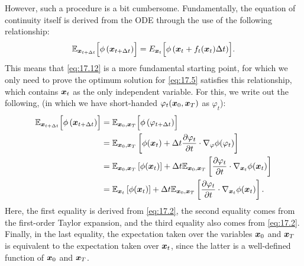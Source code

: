 However, such a procedure is a bit cumbersome. Fundamentally, the equation of continuity itself is derived from the ODE through the use of the following relationship:
\begin{equation}
    \label{eq:17.12}
\mathbb{E}_{\bm{x}_{t+\Delta t}}\Bigl[ \phi\left(\bm{x}_{t+\Delta t} \right)\Bigr]=E_{\bm{x}_{t}}\Bigl[\phi \left(\bm{x}_t +f_t(\bm{x}_t)\Delta t \right) \Bigr].
\end{equation}
This means that \cref{eq:17.12} is a more fundamental starting point, for which we only need to prove the optimum solution for \cref{eq:17.5} satisfies this relationship, which contains $\bm{x}_{t}$ as the only independent variable. For this, we write out the following, (in which we have short-handed $\varphi_t(\bm{x}_0,\bm{x}_T)$ as $\varphi_t$):
\begin{align}
    \mathbb{E}_{\bm{x}_{t+\Delta t}}\Bigl[ \phi\left(\bm{x}_{t+\Delta t} \right)\Bigr] &= \mathbb{E}_{\bm{x}_0,\bm{x}_T} \Bigl[ \phi\left(\varphi_{t+\Delta t}\right)\Bigr]\nonumber\\
    &=\mathbb{E}_{\bm{x}_0,\bm{x}_T} \left[ \phi(\bm{x}_{t}) +\Delta t\frac{\partial \varphi_t}{\partial t}\cdot\nabla_{\varphi}\phi(\varphi_t)  \right] \label{eq:17.13}\\
    &= \mathbb{E}_{\bm{x}_0,\bm{x}_T} \left[ \phi(\bm{x}_{t})\right] + \Delta t \mathbb{E}_{\bm{x}_0,\bm{x}_T} \left[ \frac{\partial \varphi_t}{\partial t}\cdot\nabla_{\bm{x}_{t}}\phi(\bm{x}_{t})  \right]\nonumber \\
    &= \mathbb{E}_{\bm{x}_{t}} \left[ \phi(\bm{x}_{t})\right] + \Delta t \mathbb{E}_{\bm{x}_0,\bm{x}_T} \left[ \frac{\partial \varphi_t}{\partial t}\cdot\nabla_{\bm{x}_{t}}\phi(\bm{x}_{t})  \right].\nonumber
\end{align}
Here, the first equality is derived from \cref{eq:17.2}, the second equality comes from the first-order Taylor expansion, and the third equality also comes from \cref{eq:17.2}. Finally, in the last equality, the expectation taken over the variables $\bm{x}_0$ and $\bm{x}_T$ is equivalent to the expectation taken over $\bm{x}_{t}$, since the latter is a well-defined function of $\bm{x}_0$ and $\bm{x}_T$. 


